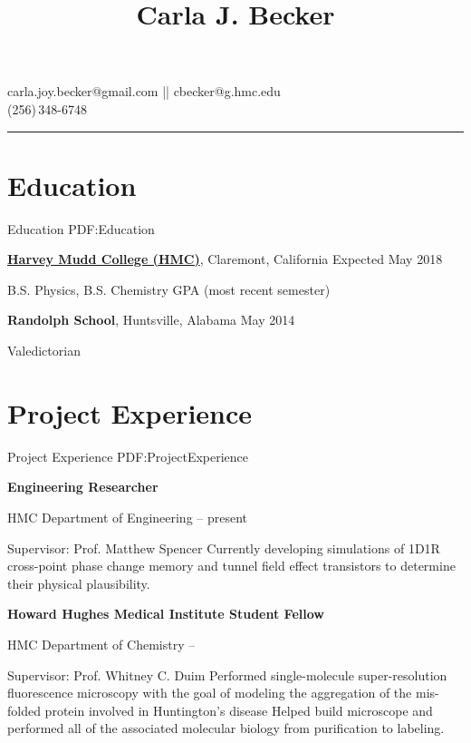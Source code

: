 \documentclass[letterpaper,10pt,oneside]{article}
\newcommand{\CVAuthor}{Carla J. Becker}
\begin{document}

\title{\CVAuthor}

\begin{subtitle}
carla.joy.becker@gmail.com || cbecker@g.hmc.edu
\\
(256)\,348-6748 
\end{subtitle}
\vspace{2mm}
\hrule
\begin{body}


\section
{Education}
{Education}
{PDF:Education}

\href{https://www.hmc.edu/}
{\textbf{Harvey Mudd College (HMC)}},
Claremont, California
\hfill
Expected May 2018

\GapNoBreak
\BulletItem
B.S. Physics, B.S. Chemistry 
 GPA (most recent semester)

\Gap
{\textbf{Randolph School}},
Huntsville, Alabama
\hfill
May 2014

\GapNoBreak
\BulletItem
Valedictorian


\section
{Project Experience}
{Project Experience}
{PDF:ProjectExperience}

{\textbf{Engineering Researcher}}

\GapNoBreak
\BulletItem
HMC Department of Engineering
\hfill
{} --
present
\begin{detail}
\SubBulletItem
Supervisor:
Prof. Matthew Spencer
\SubBulletItemBullet
Currently developing simulations of 1D1R cross-point phase change memory and tunnel field effect transistors to determine their physical plausibility.
\end{detail}

\BigGap

{\textbf{Howard Hughes Medical Institute Student Fellow}}

\GapNoBreak
\BulletItem
HMC Department of Chemistry
\hfill
{} --
\begin{detail}
\SubBulletItem
Supervisor:
Prof. Whitney C. Duim
\SubBulletItemBullet
Performed single-molecule super-resolution fluorescence microscopy with the goal of modeling the aggregation of the mis-folded protein involved in	Huntington's disease
\SubBulletItemBullet
Helped build microscope and performed all of the associated molecular biology from purification to labeling.
\end{detail}


\end{body}
\end{document}
